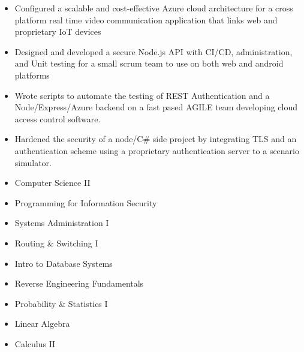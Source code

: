 

\begin{itemize}
\item Configured a scalable and cost-effective Azure cloud architecture for a cross platform real time video communication application that links web and proprietary IoT devices
\item Designed and developed a secure Node.js API with CI/CD, administration, and Unit testing for a small scrum team to use on both web and android platforms 
\end{itemize}

\divider

\begin{itemize}
\item Wrote scripts to automate the testing of REST Authentication and a Node/Express/Azure backend on a fast pased AGILE team developing cloud access control software.
\item Hardened the security of a node/C# side project by integrating TLS and an authentication scheme using a proprietary authentication server to a scenario simulator. 
\end{itemize}


\vspace{.075in}

{}
\smallskip
\begin{itemize}
\item Computer Science II
\smallskip
\item Programming for Information Security
\smallskip
\item Systems Administration I
\smallskip
\item Routing \& Switching I
\smallskip
\item Intro to Database Systems
\smallskip
\item Reverse Engineering Fundamentals
\smallskip
\item Probability \& Statistics I
\smallskip
\item Linear Algebra
\smallskip
\item Calculus II
\end{itemize}

